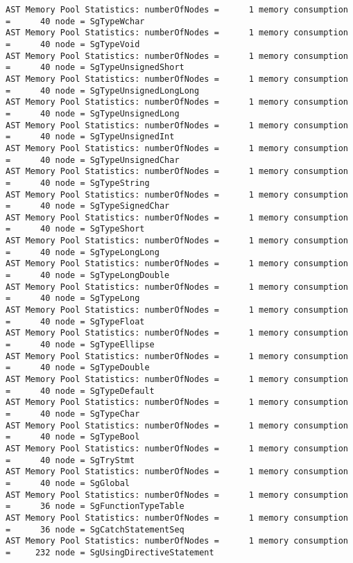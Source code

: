 {\begin{verbatim}
AST Memory Pool Statistics: numberOfNodes =      1 memory consumption =      40 node = SgTypeWchar
AST Memory Pool Statistics: numberOfNodes =      1 memory consumption =      40 node = SgTypeVoid
AST Memory Pool Statistics: numberOfNodes =      1 memory consumption =      40 node = SgTypeUnsignedShort
AST Memory Pool Statistics: numberOfNodes =      1 memory consumption =      40 node = SgTypeUnsignedLongLong
AST Memory Pool Statistics: numberOfNodes =      1 memory consumption =      40 node = SgTypeUnsignedLong
AST Memory Pool Statistics: numberOfNodes =      1 memory consumption =      40 node = SgTypeUnsignedInt
AST Memory Pool Statistics: numberOfNodes =      1 memory consumption =      40 node = SgTypeUnsignedChar
AST Memory Pool Statistics: numberOfNodes =      1 memory consumption =      40 node = SgTypeString
AST Memory Pool Statistics: numberOfNodes =      1 memory consumption =      40 node = SgTypeSignedChar
AST Memory Pool Statistics: numberOfNodes =      1 memory consumption =      40 node = SgTypeShort
AST Memory Pool Statistics: numberOfNodes =      1 memory consumption =      40 node = SgTypeLongLong
AST Memory Pool Statistics: numberOfNodes =      1 memory consumption =      40 node = SgTypeLongDouble
AST Memory Pool Statistics: numberOfNodes =      1 memory consumption =      40 node = SgTypeLong
AST Memory Pool Statistics: numberOfNodes =      1 memory consumption =      40 node = SgTypeFloat
AST Memory Pool Statistics: numberOfNodes =      1 memory consumption =      40 node = SgTypeEllipse
AST Memory Pool Statistics: numberOfNodes =      1 memory consumption =      40 node = SgTypeDouble
AST Memory Pool Statistics: numberOfNodes =      1 memory consumption =      40 node = SgTypeDefault
AST Memory Pool Statistics: numberOfNodes =      1 memory consumption =      40 node = SgTypeChar
AST Memory Pool Statistics: numberOfNodes =      1 memory consumption =      40 node = SgTypeBool
AST Memory Pool Statistics: numberOfNodes =      1 memory consumption =      40 node = SgTryStmt
AST Memory Pool Statistics: numberOfNodes =      1 memory consumption =      40 node = SgGlobal
AST Memory Pool Statistics: numberOfNodes =      1 memory consumption =      36 node = SgFunctionTypeTable
AST Memory Pool Statistics: numberOfNodes =      1 memory consumption =      36 node = SgCatchStatementSeq
AST Memory Pool Statistics: numberOfNodes =      1 memory consumption =     232 node = SgUsingDirectiveStatement
\end{verbatim}
}

